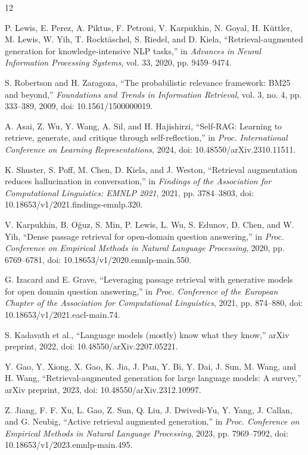 \begin{thebibliography}{12}

 P. Lewis, E. Perez, A. Piktus, F. Petroni, V. Karpukhin, N. Goyal, H. K\"{u}ttler, M. Lewis, W. Yih, T. Rockt\"{a}schel, S. Riedel, and D. Kiela, ``Retrieval-augmented generation for knowledge-intensive NLP tasks,'' in \emph{Advances in Neural Information Processing Systems}, vol. 33, 2020, pp. 9459--9474.

 S. Robertson and H. Zaragoza, ``The probabilistic relevance framework: BM25 and beyond,'' \emph{Foundations and Trends in Information Retrieval}, vol. 3, no. 4, pp. 333--389, 2009, doi: 10.1561/1500000019.

 A. Asai, Z. Wu, Y. Wang, A. Sil, and H. Hajishirzi, ``Self-RAG: Learning to retrieve, generate, and critique through self-reflection,'' in \emph{Proc. International Conference on Learning Representations}, 2024, doi: 10.48550/arXiv.2310.11511.

 K. Shuster, S. Poff, M. Chen, D. Kiela, and J. Weston, ``Retrieval augmentation reduces hallucination in conversation,'' in \emph{Findings of the Association for Computational Linguistics: EMNLP 2021}, 2021, pp. 3784--3803, doi: 10.18653/v1/2021.findings-emnlp.320.

 V. Karpukhin, B. O\u{g}uz, S. Min, P. Lewis, L. Wu, S. Edunov, D. Chen, and W. Yih, ``Dense passage retrieval for open-domain question answering,'' in \emph{Proc. Conference on Empirical Methods in Natural Language Processing}, 2020, pp. 6769--6781, doi: 10.18653/v1/2020.emnlp-main.550.

 G. Izacard and E. Grave, ``Leveraging passage retrieval with generative models for open domain question answering,'' in \emph{Proc. Conference of the European Chapter of the Association for Computational Linguistics}, 2021, pp. 874--880, doi: 10.18653/v1/2021.eacl-main.74.

 S. Kadavath et al., ``Language models (mostly) know what they know,'' arXiv preprint, 2022, doi: 10.48550/arXiv.2207.05221.

 Y. Gao, Y. Xiong, X. Gao, K. Jia, J. Pan, Y. Bi, Y. Dai, J. Sun, M. Wang, and H. Wang, ``Retrieval-augmented generation for large language models: A survey,'' arXiv preprint, 2023, doi: 10.48550/arXiv.2312.10997.

 Z. Jiang, F. F. Xu, L. Gao, Z. Sun, Q. Liu, J. Dwivedi-Yu, Y. Yang, J. Callan, and G. Neubig, ``Active retrieval augmented generation,'' in \emph{Proc. Conference on Empirical Methods in Natural Language Processing}, 2023, pp. 7969--7992, doi: 10.18653/v1/2023.emnlp-main.495.


\end{thebibliography}
